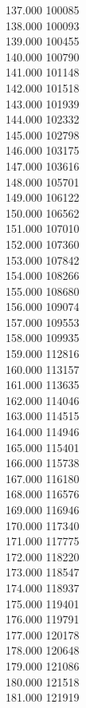 { 137.000	100085 \\
 138.000	100093 \\
 139.000	100455 \\
 140.000	100790 \\
 141.000	101148 \\
 142.000	101518 \\
 143.000	101939 \\
 144.000	102332 \\
 145.000	102798 \\
 146.000	103175 \\
 147.000	103616 \\
 148.000	105701 \\
 149.000	106122 \\
 150.000	106562 \\
 151.000	107010 \\
 152.000	107360 \\
 153.000	107842 \\
 154.000	108266 \\
 155.000	108680 \\
 156.000	109074 \\
 157.000	109553 \\
 158.000	109935 \\
 159.000	112816 \\
 160.000	113157 \\
 161.000	113635 \\
 162.000	114046 \\
 163.000	114515 \\
 164.000	114946 \\
 165.000	115401 \\
 166.000	115738 \\
 167.000	116180 \\
 168.000	116576 \\
 169.000	116946 \\
 170.000	117340 \\
 171.000	117775 \\
 172.000	118220 \\
 173.000	118547 \\
 174.000	118937 \\
 175.000	119401 \\
 176.000	119791 \\
 177.000	120178 \\
 178.000	120648 \\
 179.000	121086 \\
 180.000	121518 \\
 181.000	121919 \\
}

